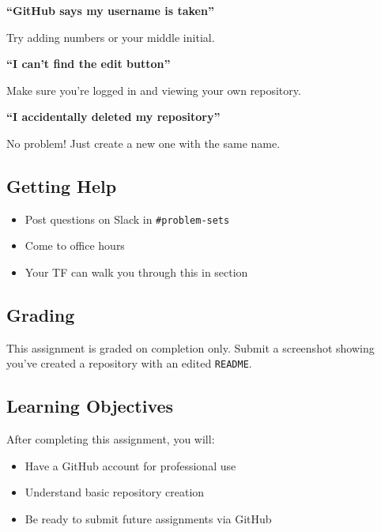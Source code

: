 \documentclass[
  11pt,
  letterpaper]{article}
\providecommand{\tightlist}{%
  \setlength{\itemsep}{0pt}\setlength{\parskip}{0pt}}
\begin{document}
\textbf{``GitHub says my username is taken''}

Try adding numbers or your middle initial.

\textbf{``I can't find the edit button''}

Make sure you're logged in and viewing your own repository.

\textbf{``I accidentally deleted my repository''}

No problem! Just create a new one with the same name.

\subsection{Getting Help}\label{getting-help}

\begin{itemize}
\tightlist
\item
  Post questions on Slack in \texttt{\#problem-sets}
\item
  Come to office hours
\item
  Your TF can walk you through this in section
\end{itemize}

\subsection{Grading}\label{grading}

This assignment is graded on completion only. Submit a screenshot
showing you've created a repository with an edited \texttt{README}.

\subsection{Learning Objectives}\label{learning-objectives}

After completing this assignment, you will:

\begin{itemize}
\tightlist
\item
  Have a GitHub account for professional use
\item
  Understand basic repository creation
\item
  Be ready to submit future assignments via GitHub
\end{itemize}
\end{document}
